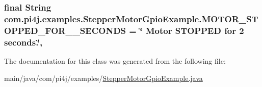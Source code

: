 \subsubsection[{M\+O\+T\+O\+R\+\_\+\+S\+T\+O\+P\+P\+E\+D\+\_\+\+F\+O\+R\+\_\+2\+\_\+\+S\+E\+C\+O\+N\+D\+S}]{\setlength{\rightskip}{0pt plus 5cm}final String com.\+pi4j.\+examples.\+Stepper\+Motor\+Gpio\+Example.\+M\+O\+T\+O\+R\+\_\+\+S\+T\+O\+P\+P\+E\+D\+\_\+\+F\+O\+R\+\_\+\_\+\+S\+E\+C\+O\+N\+D\+S = \char`\"{} Motor S\+T\+O\+P\+P\+E\+D for 2 seconds.\char`\"{}\hspace{0.3cm}{\ttfamily [static]}, {\ttfamily [private]}}\label{classcom_1_1pi4j_1_1examples_1_1StepperMotorGpioExample_acdf634e387acc55afca905a7b28468eb}


The documentation for this class was generated from the following file\+:\begin{DoxyCompactItemize}
\item 
main/java/com/pi4j/examples/\hyperlink{StepperMotorGpioExample_8java}{Stepper\+Motor\+Gpio\+Example.\+java}\end{DoxyCompactItemize}
